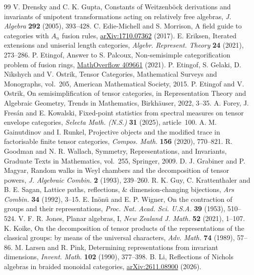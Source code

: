 \documentclass[11pt,reqno]{amsart}
\theoremstyle{definition}
\begin{document}
{\begin{thebibliography}{99}
 V. Drensky and C. K. Gupta, Constants of Weitzenb\"ock derivations and invariants of unipotent transformations acting on relatively free algebras,
\emph{J. Algebra} \textbf{292} (2005), 393--428.
 C. Edie-Michell and S. Morrison, A field guide to categories with $A_n$ fusion rules, \href{https://arxiv.org/pdf/1710.07362}{\textcolor{black}{\mbox{arXiv:1710.07362}}} (2017).
E. Eriksen, Iterated extensions and uniserial length categories,
\emph{Algebr. Represent. Theory} \textbf{24} (2021), 273--286.
 P. Etingof, Answer to S. Palcoux, Non-semisimple categorification problem of fusion rings, \href{https://mathoverflow.net/a/409926}{MathOverflow 409661} (2021).
 P. Etingof, S. Gelaki, D. Nikshych and V. Ostrik,
Tensor Categories, Mathematical Surveys and Monographs, vol.~205, American Mathematical Society, 2015.
 P. Etingof and V. Ostrik, On semisimplification of tensor categories, in Representation Theory and Algebraic Geometry, Trends in Mathematics, Birkh\"auser, 2022, 3--35.
 A. Forey, J. Fres\'an and E. Kowalski,
Fixed-point statistics from spectral measures on tensor envelope categories,
\emph{Selecta Math. (N.S.)} \textbf{31} (2025), article~100.
 A. M. Gainutdinov and I. Runkel, Projective objects and the modified trace in factorisable finite tensor categories, \emph{Compos. Math.} \textbf{156} (2020), 770--821.
 R. Goodman and N. R. Wallach, Symmetry, Representations, and Invariants, Graduate Texts in Mathematics, vol.~255, Springer, 2009.
 D. J. Grabiner and P. Magyar, Random walks in Weyl chambers and the decomposition of tensor powers, \emph{J. Algebraic Combin.} \textbf{2} (1993), 239--260.
 R. K. Guy, C. Krattenthaler and B. E. Sagan, Lattice paths, reflections, \& dimension-changing bijections, \emph{Ars Combin.} \textbf{34} (1992), 3--15.
 E. In\"on\"u and E. P. Wigner, On the contraction of groups and their representations, \emph{Proc. Nat. Acad. Sci. U.S.A.} \textbf{39} (1953), 510--524.
 V. F. R. Jones, Planar algebras, I, \emph{New Zealand J. Math.} \textbf{52} (2021), 1--107.
 K. Koike, On the decomposition of tensor products of the representations of the classical groups: by means of the universal characters, \emph{Adv. Math.} \textbf{74} (1989), 57--86.
 M. Larsen and R. Pink, Determining representations from invariant dimensions,
\emph{Invent. Math.} \textbf{102} (1990), 377--398.
 B. Li, Reflections of Nichols algebras in braided monoidal categories, \href{https://arxiv.org/abs/2611.08900}{arXiv:2611.08900} (2026).

\end{thebibliography}}
\end{document}
